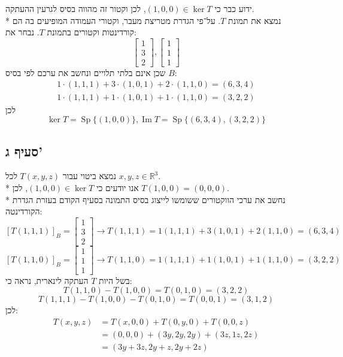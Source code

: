 \documentclass[a4paper,10pt]{article}
\DeclareMathOperator\Sp{Sp}
\DeclareMathOperator\im{Im}
\begin{document}
\begin{hebrew}
	ידוע כבר כי $(1, 0, 0) \in \ker T$,
	לכן וקטור זה מהווה בסיס לגרעין ההעתקה. \\*
	נמצא את תמונת $T$. על־פי הגדרת מטריצת מעבר, וקטורי העמודה המופיעים בה הם קורדינטות וקטורים בתמונת $T$.
	נבחר את:
	\[
		\begin{bmatrix}
			1 \\ 3 \\ 2
		\end{bmatrix},
		\begin{bmatrix}
			1 \\ 1 \\ 1
		\end{bmatrix}
	\]
	שכן אינם בלתי תלויים ונחשב את ערכם לפי בסיס $B$:
	\begin{align*}
		1 \cdot (1, 1, 1) + 3 \cdot (1, 0, 1) + 2 \cdot (1, 1, 0) = (6, 3, 4) \\
		1 \cdot (1, 1, 1) + 1 \cdot (1, 0, 1) + 1 \cdot (1, 1, 0) = (3, 2, 2)
	\end{align*}
	לכן
	\[
		\ker T = \Sp\{(1, 0, 0)\},
		\im T = \Sp\{(6, 3, 4), (3, 2, 2)\}
	\]

	\subsection{סעיף ג'}
	נמצא ביטוי עבור $T(x, y, z)$ לכל $x, y, z \in \mathbb{R}^3$. \\*
	אנו יודעים כי $(1, 0, 0) \in \ker T$, לכן $T(1, 0, 0) = (0, 0, 0)$. \\*
	נחשב את ערכי הווקטורים ששומשו לייצוג בסיס התמונה בסעיף הקודם בעזרת 
	הגדרת הקורדינטה:
	\[
		{[T(1, 1, 1)]}_B
		= \begin{bmatrix} 1 \\ 3 \\ 2 \end{bmatrix}
		\rightarrow T(1, 1, 1)
		= 1(1, 1, 1) + 3(1, 0, 1) + 2(1, 1, 0)
		= (6, 3, 4)
	\]
	\[
		{[T(1, 1, 0)]}_B
		= \begin{bmatrix} 1 \\ 1 \\ 1 \end{bmatrix}
		\rightarrow T(1, 1, 0)
		= 1(1, 1, 1) + 1(1, 0, 1) + 1(1, 1, 0)
		= (3, 2, 2)
	\]
	בשל היות $T$ העתקה לינארית, נראה כי:
	\[
		T(1, 1, 0) - T(1, 0, 0) = T(0, 1, 0) = (3, 2, 2)
	\]
	\[
		T(1, 1, 1) - T(1, 0, 0) - T(0, 1, 0) = T(0, 0, 1) = (3, 1, 2)
	\]
	לכן:
	\[
		\begin{aligned}
			T(x, y, z)
			& = T(x, 0, 0) + T(0, y, 0)  + T(0, 0, z) \\
			& = (0, 0, 0) + (3y, 2y, 2y) + (3z, 1z, 2z) \\
			& = (3y + 3z, 2y + z, 2y + 2z) \\
		\end{aligned}
	\]
	\end{hebrew}
\end{document}
